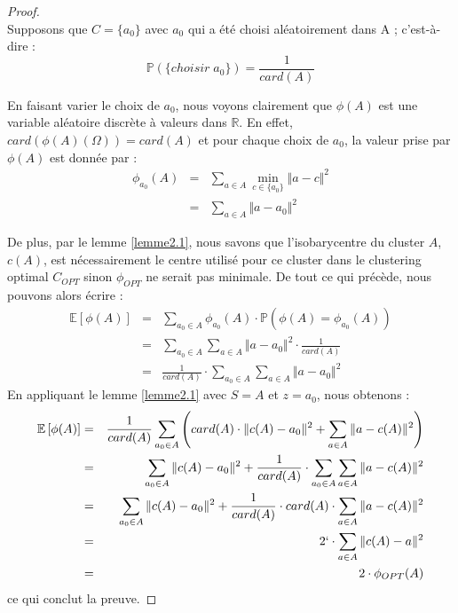 \documentclass[12pt,a4paper]{book}
\newcommand{\R}{\mathbb{R}}
\newcommand{\E}{\mathbb{E}}
\newcommand{\p}{\mathbb{P}}
\newcommand{\1}{\mathds{1}}
\begin{document}
	\begin{proof}
		~\\
		Supposons que $C=\{ a_0 \}$  avec $a_0$ qui a été choisi aléatoirement dans A ; c'est-à-dire :
		$$
			\p \left( \{ choisir \; a_0  \} \right) = \frac{1}{card(A)}
		$$
		
		En faisant varier le choix de $a_0$, nous voyons clairement que $\phi(A)$ est une variable aléatoire discrète à valeurs dans $\R$. En effet, $card\left(\phi(A)\left(\Omega\right)\right) = card(A)$ et pour chaque choix de $a_0$, la valeur prise par $\phi(A)$ est donnée par :
		\begin{eqnarray*}
			\phi_{a_0}(A) &=& \sum_{a \in A} \min_{c \in \{ a_0 \}} \Vert a - c \Vert^2 \\
			&=& \sum_{a \in A} \Vert a - a_0 \Vert^2
		\end{eqnarray*}
		
		De plus, par le lemme \ref{lemme2.1}, nous savons que l'isobarycentre du cluster $A$, $c(A)$, est nécessairement le centre utilisé pour ce cluster dans le clustering optimal $C_{OPT}$ sinon $\phi_{OPT}$ ne serait pas minimale.
		De tout ce qui précède, nous pouvons alors écrire :
		\begin{eqnarray*}
			\E\left[\phi(A)\right] &=& \sum_{a_0 \in A} \phi_{a_0}(A) \cdot \p \left( \phi(A)= \phi_{a_0}(A) \right) \\
			&=& \sum_{a_0 \in A} \sum_{a \in A} \Vert a-a_0 \Vert^2 \cdot \frac{1}{card(A)} \\
			&=& \frac{1}{card(A)} \cdot \sum_{a_0 \in A} \sum_{a \in A} \Vert a-a_0 \Vert^2
		\end{eqnarray*}
		En appliquant le lemme \ref{lemme2.1} avec $S=A$ et $z=a_0$, nous obtenons :
		\begin{eqnarray*}
			\E\left[\phi(A)\right] &=& \frac{1}{card(A)} \sum_{a_0 \in A} \left( card(A) \cdot \Vert c(A)-a_0 \Vert^2 + \sum_{a \in A} \Vert a - c(A) \Vert^2 \right) \\
			&=& \sum_{a_0 \in A} \Vert c(A)-a_0 \Vert^2 + \frac{1}{card(A)} \cdot \sum_{a_0 \in A} \sum_{a \in A}\Vert a - c(A) \Vert^2 \\
			&=& \sum_{a_0 \in A} \Vert c(A)-a_0 \Vert^2 + \frac{1}{card(A)} \cdot card(A) \cdot \sum_{a \in A}\Vert a - c(A) \Vert^2 \\
			&=& 2 `\cdot \sum_{a \in A} \Vert c(A) - a \Vert^2 \\
			&=& 2 \cdot \phi_{OPT}(A)
		\end{eqnarray*}
		ce qui conclut la preuve.
	\end{proof}
\end{document}

